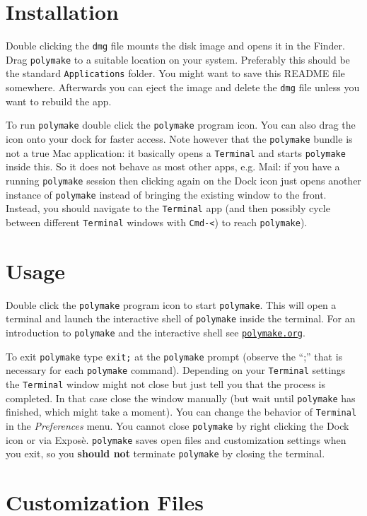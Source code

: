 \documentclass[a4paper]{amsart}
\newcommand{\polymake}{\texttt{polymake}\xspace}
\begin{document}
\section*{Installation}

Double clicking the \texttt{dmg} file mounts the disk image and opens
it in the Finder. Drag \polymake to a suitable location on your
system. Preferably this should be the standard \texttt{Applications}
folder. You might want to save this README file somewhere. Afterwards
you can eject the image and delete the  \texttt{dmg} file unless you
want to rebuild the app.

To run \polymake double click the \polymake program icon. You can
also drag the icon onto your dock for faster access. Note however that
the \polymake bundle is not a true Mac application: it basically
opens a \texttt{Terminal} and starts \polymake inside this. So it does not
behave as most other apps, e.g. Mail: if you have a running \polymake
session then clicking again on the Dock icon just opens another
instance of \polymake instead of bringing the existing window to the
front. Instead, you should navigate to the \texttt{Terminal} app (and then
possibly cycle between different \texttt{Terminal} windows with \texttt{Cmd-<})
to reach \polymake).

\section*{Usage}

Double click the \polymake program icon to start \polymake. This will
open a terminal and launch the interactive shell of \polymake inside
the terminal. For an introduction to \polymake and the interactive
shell see \href{http://polymake.org}{\tt polymake.org}\;.

To exit \polymake type \texttt{exit;} at the \polymake prompt
(observe the ``;'' that is necessary for each \polymake
command). Depending on your \texttt{Terminal} settings the
\texttt{Terminal} window might not close but just tell you that the
process is completed. In that case close the window manually (but wait
until \polymake has finished, which might take a moment). You can
change the behavior of \texttt{Terminal} in the \textit{Preferences}
menu.  You cannot close \polymake by right clicking the Dock icon or
via Expos\`e. \polymake saves open files and customization settings
when you exit, so you \textbf{should not} terminate \polymake by
closing the terminal.

\section*{Customization Files}
\end{document}
